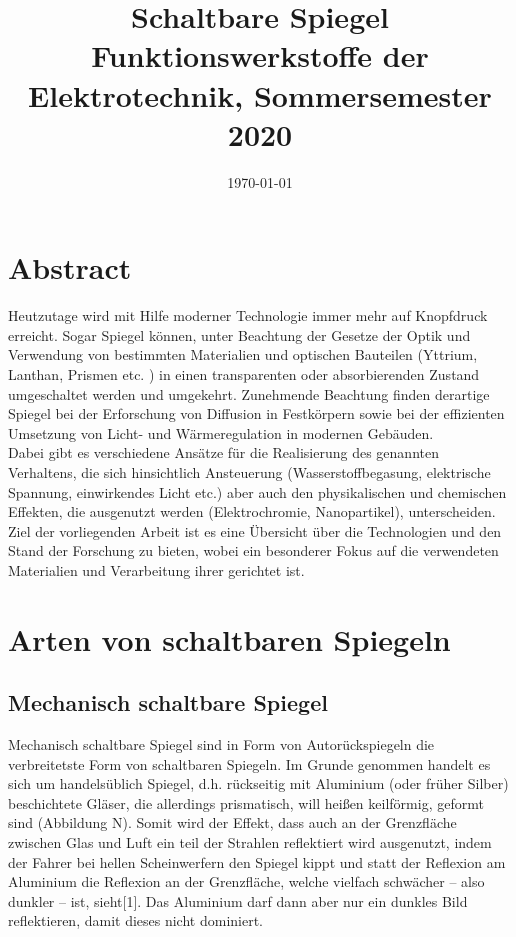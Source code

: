 \documentclass[11pt]{article}
\title{\textbf{Schaltbare Spiegel}\\ {Funktionswerkstoffe der Elektrotechnik, Sommersemester 2020}}
\date{\today}
\begin{document}
\maketitle
\section{Abstract}
Heutzutage wird mit Hilfe moderner Technologie immer mehr auf Knopfdruck erreicht. Sogar Spiegel können, unter Beachtung der Gesetze der Optik und Verwendung von bestimmten Materialien und optischen Bauteilen (Yttrium, Lanthan, Prismen etc. ) in einen transparenten oder absorbierenden Zustand umgeschaltet werden und umgekehrt. Zunehmende Beachtung finden derartige Spiegel bei der Erforschung von Diffusion in Festkörpern sowie bei der effizienten Umsetzung von Licht- und Wärmeregulation in modernen Gebäuden.\\
Dabei gibt es verschiedene Ansätze für die Realisierung des genannten Verhaltens, die sich hinsichtlich Ansteuerung (Wasserstoffbegasung, elektrische Spannung, einwirkendes Licht etc.) aber auch den physikalischen und chemischen Effekten, die ausgenutzt werden (Elektrochromie, Nanopartikel), unterscheiden. Ziel der vorliegenden Arbeit ist es eine Übersicht über die Technologien und den Stand der Forschung zu bieten, wobei ein besonderer Fokus auf die verwendeten Materialien und Verarbeitung ihrer gerichtet ist.
\section{Arten von schaltbaren Spiegeln}
\subsection{Mechanisch schaltbare Spiegel}
Mechanisch schaltbare Spiegel sind in Form von Autorückspiegeln die verbreitetste Form von schaltbaren Spiegeln. Im Grunde genommen handelt es sich um handelsüblich Spiegel, d.h. rückseitig mit Aluminium (oder früher Silber) beschichtete Gläser, die allerdings prismatisch, will heißen keilförmig, geformt sind (Abbildung N). Somit wird der Effekt, dass auch an der Grenzfläche zwischen Glas und Luft ein teil der Strahlen reflektiert wird ausgenutzt, indem der Fahrer bei hellen Scheinwerfern den Spiegel kippt und statt der Reflexion am Aluminium die Reflexion an der Grenzfläche, welche vielfach schwächer – also dunkler – ist, sieht[1]. Das Aluminium darf dann aber nur ein dunkles Bild reflektieren, damit dieses nicht dominiert.
\end{document}
